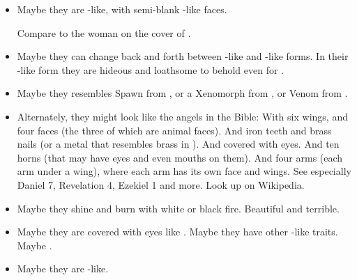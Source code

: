 \begin{itemize}
  \item 
    Maybe they are \bane-like, with semi-blank \bane-like faces. 
    
    Compare to the woman on the cover of .
    
  \item 
    Maybe they can change back and forth between \human-like and \bane-like forms. 
    In their \bane-like form they are hideous and loathsome to behold even for \resphain. 
    
  \item 
    Maybe they resembles Spawn from \cite{ToddMcFarlane:Spawn}, 
    or a Xenomorph from \cite{Movie:Alien}, 
    or Venom from \cite{StanLeeSteveDitko:SpiderMan}. 
    
  \item 
    Alternately, they might look like the angels in the Bible: 
    With six wings, and four faces (the three of which are animal faces).
    And iron teeth and brass nails (or a metal that resembles brass in \colour). 
    And covered with eyes. 
    And ten horns (that may have eyes and even mouths on them). 
    And four arms (each arm under a wing), where each arm has its own face and wings. 
    See especially Daniel 7, Revelation 4, Ezekiel 1 and more. 
    Look up  on Wikipedia. 
  
  \item 
    Maybe they shine and burn with white or black fire. 
    Beautiful and terrible. 
  
  \item 
    Maybe they are covered with eyes like \noggyaleth.
    Maybe they have other \noggyal-like traits. 
    Maybe . 
  
  \item 
    Maybe they are \dragon-like. 
\end{itemize}








